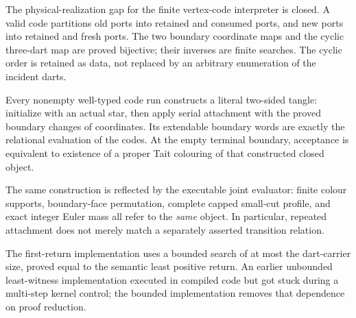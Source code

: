 The physical-realization gap for the finite vertex-code interpreter is
closed. A valid code partitions old ports into retained and consumed
ports, and new ports into retained and fresh ports. The two boundary
coordinate maps and the cyclic three-dart map are proved bijective;
their inverses are finite searches. The cyclic order is retained as
data, not replaced by an arbitrary enumeration of the incident darts.

Every nonempty well-typed code run constructs a literal two-sided
tangle: initialize with an actual star, then apply serial attachment
with the proved boundary changes of coordinates. Its extendable
boundary words are exactly the relational evaluation of the codes.
At the empty terminal boundary, acceptance is equivalent to existence
of a proper Tait colouring of that constructed closed object.

The same construction is reflected by the executable joint evaluator:
finite colour supports, boundary-face permutation, complete capped
small-cut profile, and exact integer Euler mass all refer to the
\emph{same} object. In particular, repeated attachment does not merely
match a separately asserted transition relation.

The first-return implementation uses a bounded search of at most the
dart-carrier size, proved equal to the semantic least positive return.
An earlier unbounded least-witness implementation executed in compiled
code but got stuck during a multi-step kernel control; the bounded
implementation removes that dependence on proof reduction.

